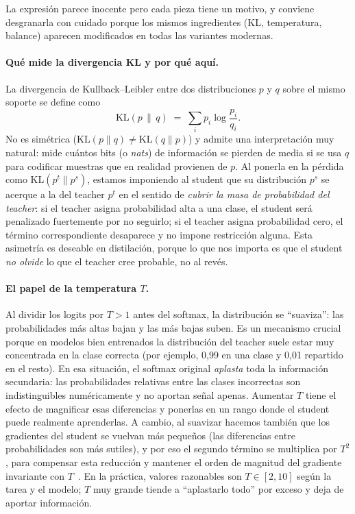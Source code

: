 La expresión parece inocente pero cada pieza tiene un motivo, y conviene desgranarla con cuidado porque los mismos ingredientes (KL, temperatura, balance) aparecen modificados en todas las variantes modernas.

\paragraph{Qué mide la divergencia KL y por qué aquí.} La divergencia de Kullback--Leibler entre dos distribuciones $p$ y $q$ sobre el mismo soporte se define como
\[
\mathrm{KL}(p\,\|\,q) \;=\; \sum_{i} p_i \log\!\frac{p_i}{q_i}.
\]
No es simétrica ($\mathrm{KL}(p\|q)\neq \mathrm{KL}(q\|p)$) y admite una interpretación muy natural: mide cuántos bits (o \emph{nats}) de información se pierden de media si se usa $q$ para codificar muestras que en realidad provienen de $p$. Al ponerla en la pérdida como $\mathrm{KL}(p^t\|p^s)$, estamos imponiendo al student que su distribución $p^s$ se acerque a la del teacher $p^t$ en el sentido de \emph{cubrir la masa de probabilidad del teacher}: si el teacher asigna probabilidad alta a una clase, el student será penalizado fuertemente por no seguirlo; si el teacher asigna probabilidad cero, el término correspondiente desaparece y no impone restricción alguna. Esta asimetría es deseable en distilación, porque lo que nos importa es que el student \emph{no olvide} lo que el teacher cree probable, no al revés.

\paragraph{El papel de la temperatura $T$.} Al dividir los logits por $T>1$ antes del softmax, la distribución se ``suaviza'': las probabilidades más altas bajan y las más bajas suben. Es un mecanismo crucial porque en modelos bien entrenados la distribución del teacher suele estar muy concentrada en la clase correcta (por ejemplo, 0,99 en una clase y 0,01 repartido en el resto). En esa situación, el softmax original \emph{aplasta} toda la información secundaria: las probabilidades relativas entre las clases incorrectas son indistinguibles numéricamente y no aportan señal apenas. Aumentar $T$ tiene el efecto de magnificar esas diferencias y ponerlas en un rango donde el student puede realmente aprenderlas. A cambio, al suavizar hacemos también que los gradientes del student se vuelvan más pequeños (las diferencias entre probabilidades son más sutiles), y por eso el segundo término se multiplica por $T^2$, para compensar esta reducción y mantener el orden de magnitud del gradiente invariante con $T$~\cite{hinton2015distilling}. En la práctica, valores razonables son $T\in[2,10]$ según la tarea y el modelo; $T$ muy grande tiende a ``aplastarlo todo'' por exceso y deja de aportar información.

